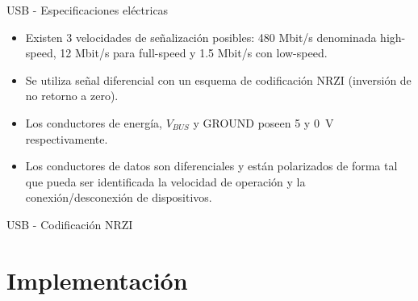 \documentclass[11pt,a4paper]{beamer}
\newcounter{wavecount}
\newcommand{\newwave}[1]{
	\path (0,\value{wavecount}) node[text width=45,anchor=east,align=right]{#1} node[coordinate](t_cur){};
	\draw (0,\value{wavecount}+.3) --++(.2,0);
	\draw (0,\value{wavecount}-.3) --++(.2,0);
	\path (t_cur) --++(.3,0)node[coordinate](t_cur){};
	\addtocounter{wavecount}{-1}}
\newcommand*{\bit}[2]{
	\draw (t_cur) -- ++(0.1,.6*#1-.3) -- ++(#2-.2,0) -- ++(+.1,.3-.6*#1)
	node[coordinate] (t_cur) {};}
\begin{document}
			\begin{frame}{USB - Especificaciones eléctricas}
				\begin{itemize}
					\item Existen 3 velocidades de señalización posibles: 480 Mbit/s denominada high-speed, 12 Mbit/s para full-speed y 1.5 Mbit/s con low-speed.
					\item Se utiliza señal diferencial con un esquema de codificación NRZI (inversión de no retorno a zero).
					\item Los conductores de energía, $V_{BUS}$ y GROUND poseen \si{5} y \SI{0}{\volt} respectivamente.
					\item Los conductores de datos son diferenciales y están polarizados de forma tal que pueda ser identificada la velocidad de operación y la conexión/desconexión de dispositivos.
				\end{itemize}
			\end{frame}
			\begin{frame}{USB - Codificación NRZI}
				\begin{figure}
				\end{figure}
			\end{frame}
	\section{Implementación}
\end{document}
